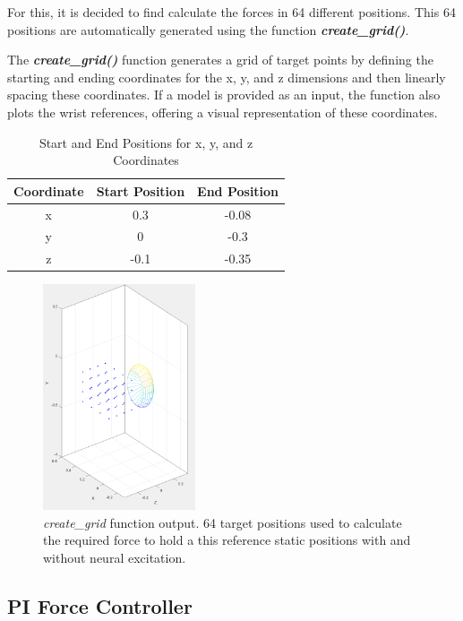  For this, it is decided to find calculate the forces in 64 different positions. This 64 positions are automatically generated using the function \textit{\textbf{create\_grid()}}.


The \textbf{\textit{create\_grid()}} function generates a grid of target points by defining the starting and ending coordinates for the x, y, and z dimensions and then linearly spacing these coordinates. If a model is provided as an input, the function also plots the wrist references, offering a visual representation of these coordinates.

\begin{table}[h]
    \centering
    \caption{Start and End Positions for x, y, and z Coordinates}

    \begin{tabular}{|c|c|c|}
        \hline
        Coordinate & Start Position & End Position \\
        \hline
        x & 0.3 & -0.08 \\
        y & 0 & -0.3 \\
        z & -0.1 & -0.35 \\
        \hline
    \end{tabular}
    \label{table:coordinates}
\end{table}

\begin{figure}[h!]
    \centering
    \includegraphics[width=0.4\textwidth]{Pictures/Model/create_grid.png}
    \caption{\textit{create\_grid} function output. 64 target positions used to calculate the required force to hold a this reference static positions with and without neural excitation.}
    \label{fig:create_grid}
\end{figure}

\newpage
\subsection{PI Force Controller}

